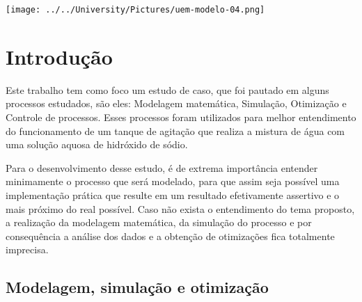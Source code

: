 \documentclass[
	12pt,				%
	openright,			%
	oneside,			%
	a4paper,			%
	english,			%
	french,				%
	spanish,			%
	brazil				%
	]{abntex2}
\begin{document}
\begin{minipage}[c][0cm][c]{0cm} %

\centering

\texttt{[image: ../../University/Pictures/uem-modelo-04.png]} 
\end{minipage}


\frenchspacing 


\imprimircapa



 
 


\tableofcontents*
\cleardoublepage

\textual

\chapter{Introdução}
\pagestyle{fancy}

Este trabalho tem como foco um estudo de caso, que foi pautado em alguns processos estudados, são eles:
Modelagem matemática, Simulação, Otimização e Controle de processos. Esses processos foram utilizados para melhor entendimento do funcionamento de um tanque de agitação que realiza a mistura de água com uma solução aquosa de hidróxido de sódio. 

Para o desenvolvimento desse estudo, é de extrema importância entender minimamente o processo que será modelado, para que assim seja possível uma implementação prática que resulte em um resultado efetivamente assertivo e o mais próximo do real possível. Caso não exista o entendimento do tema proposto, a realização da modelagem matemática, da simulação do processo e por consequência a análise dos dados e a obtenção de otimizações fica totalmente imprecisa. 

\section{Modelagem, simulação e otimização}
\end{document}
